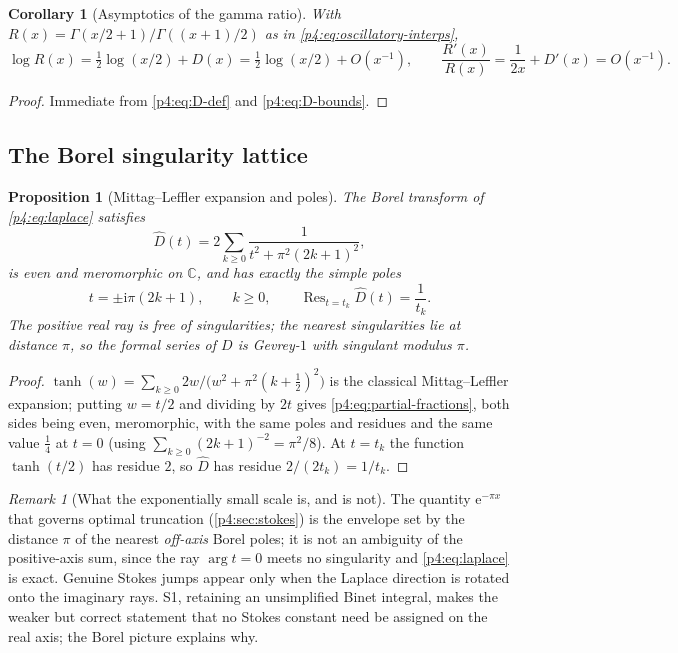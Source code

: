 \documentclass[11pt,a4paper,oneside]{book}
\theoremstyle{plain}
\newtheorem{proposition}[theorem]{Proposition}
\newtheorem{corollary}[theorem]{Corollary}
\theoremstyle{definition}
\theoremstyle{remark}
\newtheorem{remark}[theorem]{Remark}
\newcommand{\Cplx}{\mathbb{C}}
\newcommand{\e}{\mathrm{e}}
\newcommand{\ii}{\mathrm{i}}
\DeclareMathOperator{\Res}{Res}
\begin{document}
\begin{corollary}[Asymptotics of the gamma ratio]
\label{p4:cor:R-asymptotic}
With $R(x)=\Gamma(x/2+1)/\Gamma((x+1)/2)$ as in
\cref{p4:eq:oscillatory-interps},
\[
  \log R(x)=\tfrac12\log(x/2)+D(x)=\tfrac12\log(x/2)+O(x^{-1}),
  \qquad
  \frac{R'(x)}{R(x)}=\frac1{2x}+D'(x)=O(x^{-1}) .
\]
\end{corollary}

\begin{proof}
Immediate from \cref{p4:eq:D-def} and \cref{p4:eq:D-bounds}.
\end{proof}

\subsection{The Borel singularity lattice}

\begin{proposition}[Mittag--Leffler expansion and poles]
\label{p4:prop:borel-lattice}
The Borel transform of \cref{p4:eq:laplace} satisfies
\begin{equation}
  \widehat D(t)=2\sum_{k\ge0}\frac{1}{t^{2}+\pi^{2}(2k+1)^{2}} ,
  \label{p4:eq:partial-fractions}
\end{equation}
is even and meromorphic on $\Cplx$, and has exactly the simple poles
\begin{equation}
  t=\pm\ii\pi(2k+1),\qquad k\ge0,
  \qquad
  \Res_{t=t_k}\widehat D(t)=\frac1{t_k} .
  \label{p4:eq:borel-poles}
\end{equation}
The positive real ray is free of singularities; the nearest singularities lie
at distance $\pi$, so the formal series of $D$ is Gevrey-$1$ with singulant
modulus $\pi$.
\end{proposition}

\begin{proof}
$\tanh(w)=\sum_{k\ge0}2w/\bigl(w^2+\pi^2(k+\tfrac12)^2\bigr)$ is the classical
Mittag--Leffler expansion; putting $w=t/2$ and dividing by $2t$ gives
\cref{p4:eq:partial-fractions}, both sides being even, meromorphic, with the
same poles and residues and the same value $\tfrac14$ at $t=0$ (using
$\sum_{k\ge0}(2k+1)^{-2}=\pi^2/8$).  At $t=t_k$ the function $\tanh(t/2)$ has
residue $2$, so $\widehat D$ has residue $2/(2t_k)=1/t_k$.
\end{proof}

\begin{remark}[What the exponentially small scale is, and is not]
\label{p4:rem:no-real-ambiguity}
The quantity $\e^{-\pi x}$ that governs optimal truncation
(\cref{p4:sec:stokes}) is the envelope set by the distance $\pi$ of the
nearest \emph{off-axis} Borel poles; it is not an ambiguity of the
positive-axis sum, since the ray $\arg t=0$ meets no singularity and
\cref{p4:eq:laplace} is exact.  Genuine Stokes jumps appear only when the
Laplace direction is rotated onto the imaginary rays.  \textsf{S1}, retaining
an unsimplified Binet integral, makes the weaker but correct statement that no
Stokes constant need be assigned on the real axis; the Borel picture explains
why.
\end{remark}
\end{document}
